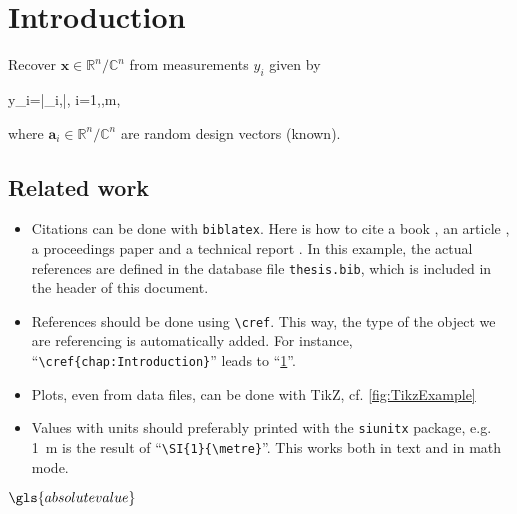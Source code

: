 \chapter{Introduction}
\label{chap:Introduction}


\begin{problem} \label{prob:mainproblem}
	Recover $\boldsymbol{x} \in \mathbb{R}^n/\mathbb{C}^n$ from measurements $y_i$ given by
	\begin{flalign}
		y_i=\left|\langle {}_i,\rangle\right|, \quad {}\; i=1,\cdots,m, \label{eq:mainproblem}
	\end{flalign}
	where $\boldsymbol{a}_i \in \mathbb{R}^n/\mathbb{C}^n$ are random design vectors (known). 
\end{problem}

\section{Related work}
\begin{itemize}
\item Citations can be done with \texttt{biblatex}. Here is how to cite a book \cite{GoWo07}, an article \cite{Ar66}, a proceedings paper \cite{Ch05} and a technical report \cite{ChEsNi04}. In this example, the actual references are defined in the database file \texttt{thesis.bib}, which is included in the header of this document.
\item References should be done using \texttt{\textbackslash cref}. This way, the type of the object we are referencing is automatically added. For instance, \enquote{\texttt{\textbackslash cref\{chap:Introduction\}}} leads to \enquote{\cref{chap:Introduction}}.
\item Plots, even from data files, can be done with TikZ, cf. \cref{fig:TikzExample}
\item Values with units should preferably printed with the \texttt{siunitx} package, e.g. \SI{1}{\metre} is the result of \enquote{\texttt{\textbackslash SI\{1\}\{\textbackslash metre\}}}. This works both in text and in math mode.
\end{itemize}
$\gls{absolute value}$
